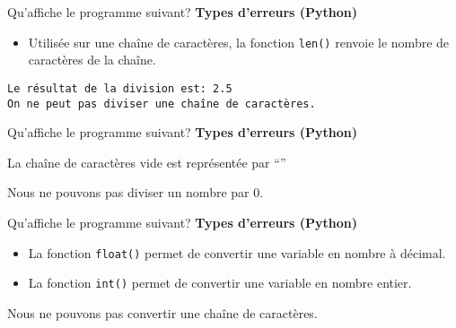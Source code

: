 \begin{Exercice}[5 minutes] Qu'affiche le programme suivant? \textbf{Types d'erreurs (Python)}\\
      
     \begin{conseil}
        \begin{itemize}
            \item Utilisée sur une chaîne de caractères, la fonction \lstinline{len()} renvoie le nombre de caractères de la chaîne. 
        \end{itemize}  
       
    \end{conseil}
     \begin{solution}
        \lstinline{Le résultat de la division est: 2.5}\\
        \lstinline{On ne peut pas diviser une chaîne de caractères.}
     \end{solution}   
 \end{Exercice}

\begin{Exercice}[5 minutes] Qu'affiche le programme suivant? \textbf{Types d'erreurs (Python)}\\
    
    
     \begin{conseil}
         La chaîne de caractères vide est représentée par ``'' 
    \end{conseil}
     \begin{solution}
        Nous ne pouvons pas diviser un nombre par 0.
     \end{solution}   
 \end{Exercice}

 \begin{Exercice}[5 minutes] Qu'affiche le programme suivant? \textbf{Types d'erreurs (Python)}\\
    
    
     \begin{conseil}
        \begin{itemize}
            \item La fonction \lstinline{float()} permet de convertir une variable en nombre à décimal.
            \item La fonction \lstinline{int()} permet de convertir une variable en nombre entier.
        \end{itemize}  
    \end{conseil}

     \begin{solution}
        Nous ne pouvons pas convertir une chaîne de caractères.
     \end{solution}

\end{Exercice}
 
